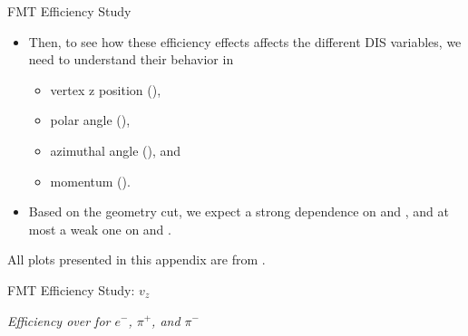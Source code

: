 \begin{frame}{FMT Efficiency Study}
    \label{20.04::fmt_efficiency_study}
    \begin{itemize}
        \item
            Then, to see how these efficiency effects affects the different DIS variables, we need to understand their behavior in

            \vspace{6pt}
            \begin{itemize}
                \item
                    vertex z position (),

                \item
                    polar angle (\ef{$\theta$}),

                \item
                    azimuthal angle (\ef{$\phi$}), and

                \item
                    momentum ().
            \end{itemize}

        \vspace{12pt}
        \item
            Based on the geometry cut, we expect a strong dependence on  and \ef{$\theta$}, and at most a weak one on \ef{$\phi$} and .
    \end{itemize}

    \vspace{12pt}
    \ef{*}All plots presented in this appendix are from .

\end{frame}

\begin{frame}{FMT Efficiency Study: $v_z$}
    \begin{center}
        \vspace{-6pt}
        \begin{figure}[t]
        \end{figure}
        \textit{Efficiency over  for $e^-$, $\pi^+$, and $\pi^-$}
    \end{center}

\end{frame}

